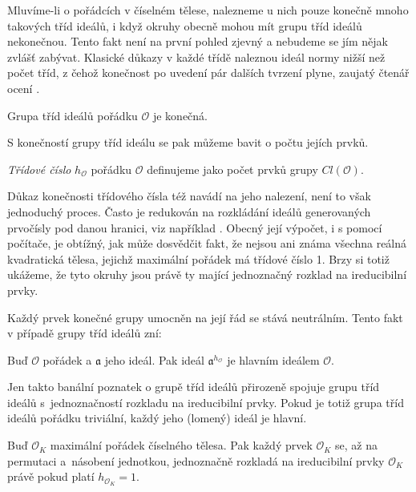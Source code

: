 \documentclass[12pt]{report}
\begin{document}
Mluvíme-li o pořádcích v číselném tělese, nalezneme u nich pouze konečně mnoho takových tříd ideálů, i když okruhy obecně mohou mít grupu tříd ideálů nekonečnou. Tento fakt není na první pohled zjevný a nebudeme se jím nějak zvlášť zabývat. Klasické důkazy v každé třídě naleznou ideál normy nižší než počet tříd, z čehož konečnost po uvedení pár dalších tvrzení plyne, zaujatý čtenář ocení \cite[Kap. 5]{Pupik}.

\begin{veta}
Grupa tříd ideálů pořádku $\mathcal{O}$ je konečná.
\end{veta}

 S konečností grupy tříd ideálu se pak můžeme bavit o počtu jejích prvků.

\begin{definice}
\textit{Třídové číslo} $h_{\mathcal{O}}$ pořádku $\mathcal{O}$ definujeme jako počet prvků grupy $Cl(\mathcal{O})$.
\end{definice}

Důkaz konečnosti třídového čísla též navádí na jeho nalezení, není to však jednoduchý proces. Často je redukován na rozkládání ideálů generovaných prvočísly pod danou hranici, viz například \cite[Kap. 5.]{Pupik}. Obecný její výpočet, i s pomocí počítače, je obtížný, jak může dosvědčit fakt, že nejsou ani známa všechna reálná kvadratická tělesa, jejichž maximální pořádek má třídové číslo 1. Brzy si totiž ukážeme, že tyto okruhy jsou právě ty mající jednoznačný rozklad na ireducibilní prvky.

Každý prvek konečné grupy umocněn na její řád se stává neutrálním. Tento fakt v případě grupy tříd ideálů zní:
\begin{veta}
Buď $\mathcal{O}$ pořádek a $\mathfrak{a}$ jeho ideál. Pak ideál $\mathfrak{a}^{h_{\mathcal{O}}}$ je hlavním ideálem $\mathcal{O}$.
\end{veta}

Jen takto banální poznatek o grupě tříd ideálů přirozeně spojuje grupu tříd ideálů s~jednoznačností rozkladu na ireducibilní prvky. Pokud je totiž grupa tříd ideálů pořádku triviální, každý jeho (lomený) ideál je hlavní.

\begin{veta}
Buď $\mathcal{O}_K$ maximální pořádek číselného tělesa. Pak každý prvek $\mathcal{O}_K$ se, až na permutaci a~násobení jednotkou, jednoznačně rozkladá na ireducibilní prvky $\mathcal{O}_K$ právě pokud platí $h_{\mathcal{O}_K} = 1$.
\end{veta}
\end{document}
